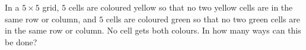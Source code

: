 In a $5\times5$ grid, $5$ cells are coloured yellow so that no two yellow cells are in the same row or column, and $5$ cells are coloured green so that no two green cells are in the same row or column. No cell gets both colours. In how many ways can this be done?
